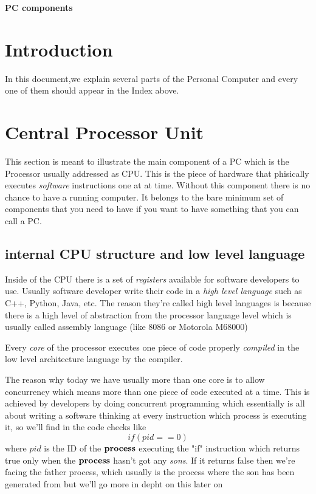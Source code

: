 \documentclass[a4paper,12pt]{article}
\begin{document}
\textbf{PC components}
\tableofcontents

\section{Introduction}
In this document,we explain several parts  of the Personal Computer
and every one of them should appear in the Index above.

\clearpage

\section{Central Processor Unit}
This section is meant to illustrate the main component of a PC 
which is the Processor usually addressed as CPU.
This is the piece of hardware that phisically executes \emph{software} instructions one at at time.
Without this component there is no chance to have a running computer. It belongs to the bare minimum set of 
components that you need to have if you want to have something that you can call a PC.

\subsection{internal CPU structure and low level language}
Inside of the CPU there is a set of \emph{registers} available for software developers to use.
Usually software developer write their code in a \emph{high level language} such as C++, Python, Java, etc.
The reason they're called high level languages is because there is a high level of abstraction from the processor
language level which is usually called assembly language (like 8086 or Motorola M68000)

Every \emph{core} of the processor executes one piece of code properly \emph {compiled} in the low level architecture language by the compiler.

The reason why today we have usually more than one core is to allow concurrency which means more than one piece of
code executed at a time. This is achieved by developers by doing concurrent programming which essentially is all about
writing a software thinking at every instruction which process is executing it, so we'll find in the code checks like
\[if (pid==0)\]
where $pid$ is the ID of the $\bf process$ executing the "if" instruction which returns true only when the $\bf process$ hasn't  got any \emph{sons}. If it returns false then we're facing the father process, which usually is the process where the son has been generated from but
we'll go more in depht on this later on
\end{document}
